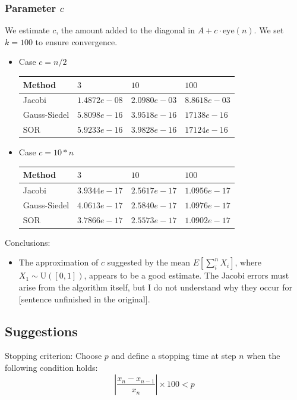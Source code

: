 \subsubsection{Parameter $c$}
We estimate \( c \), the amount added to the diagonal in \( A + c \cdot \text{eye}(n) \). We set \( k = 100 \) to ensure convergence.
\begin{itemize}
    \item Case $c = n/2$
\begin{center}
\begin{tabular}{|l|l|l|l|}
\hline
Method       & $3$            & $10$           & $100$          \\ \hline
Jacobi       & $1.4872e-08$ & $2.0980e-03$ & $8.8618e-03$ \\ \hline
Gauss-Siedel & $5.8098e-16$ & $3.9518e-16$ & $17138e-16$  \\ \hline
SOR          & $5.9233e-16$ & $3.9828e-16$ & $17124e-16$  \\ \hline
\end{tabular}
\end{center}
    \item Case $c = 10*n$
    \begin{center}
\begin{tabular}{|l|l|l|l|}
\hline
Method       & $3$            & $10$           & $100$          \\ \hline
Jacobi       & $3.9344e-17$ & $2.5617e-17$ & $1.0956e-17$ \\ \hline
Gauss-Siedel & $4.0613e-17$ & $2.5840e-17$ & $1.0976e-17$ \\ \hline
SOR          & $3.7866e-17$ & $2.5573e-17$ & $1.0902e-17$ \\ \hline
\end{tabular}
    \end{center}
\end{itemize}
Conclusions:\\
\begin{itemize}
    \item The approximation of $c$ suggested by the mean $E[\sum_i^n X_i]$, where $X_1 \sim \mathrm{U}([0, 1])$, appears to be a good estimate. The Jacobi errors must arise from the algorithm itself, but I do not understand why they occur for [sentence unfinished in the original].
\end{itemize}

\subsection{Suggestions}
Stopping criterion:
Choose $p$ and define a stopping time at step $n$ when the following condition holds:
$$\left|\frac{x_n - x_{n-1}}{x_n}\right| \times 100 < p$$
